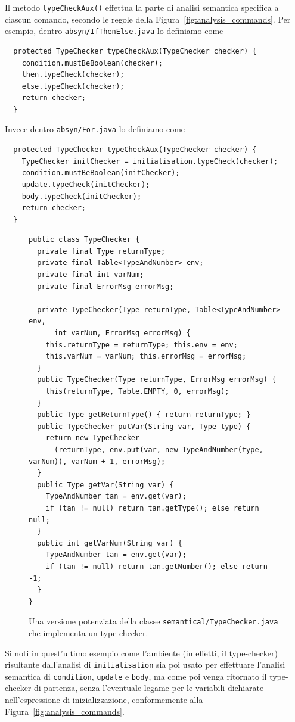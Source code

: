 Il metodo \texttt{typeCheckAux()} effettua la parte di analisi semantica
specifica a ciascun comando, secondo le regole della
Figura~\ref{fig:analysis_commands}. Per esempio, dentro
\texttt{absyn/IfThenElse.java} lo definiamo come
%
\begin{verbatim}
  protected TypeChecker typeCheckAux(TypeChecker checker) {
    condition.mustBeBoolean(checker);
    then.typeCheck(checker);
    else.typeCheck(checker);
    return checker;
  }
\end{verbatim}
%
Invece dentro \texttt{absyn/For.java} lo definiamo come
%
\begin{verbatim}
  protected TypeChecker typeCheckAux(TypeChecker checker) {
    TypeChecker initChecker = initialisation.typeCheck(checker);
    condition.mustBeBoolean(initChecker);
    update.typeCheck(initChecker);
    body.typeCheck(initChecker);
    return checker;
  }
\end{verbatim}
%
\begin{figure}[t]
{\small
\begin{verbatim}
public class TypeChecker {
  private final Type returnType;
  private final Table<TypeAndNumber> env;   
  private final int varNum;
  private final ErrorMsg errorMsg;

  private TypeChecker(Type returnType, Table<TypeAndNumber> env,
      int varNum, ErrorMsg errorMsg) {
    this.returnType = returnType; this.env = env;
    this.varNum = varNum; this.errorMsg = errorMsg;
  }
  public TypeChecker(Type returnType, ErrorMsg errorMsg) {
    this(returnType, Table.EMPTY, 0, errorMsg);
  }
  public Type getReturnType() { return returnType; }
  public TypeChecker putVar(String var, Type type) {
    return new TypeChecker
      (returnType, env.put(var, new TypeAndNumber(type, varNum)), varNum + 1, errorMsg);
  }
  public Type getVar(String var) {
    TypeAndNumber tan = env.get(var);
    if (tan != null) return tan.getType(); else return null;
  }
  public int getVarNum(String var) {
    TypeAndNumber tan = env.get(var);
    if (tan != null) return tan.getNumber(); else return -1;
  }
}
\end{verbatim}
}
\caption{Una versione potenziata della classe \texttt{semantical/TypeChecker.java} che implementa un type-checker.}
  \label{fig:semantical.TypeChecker}
\end{figure}
%
Si noti in quest'ultimo esempio come l'ambiente (in effetti, il type-checker)
risultante dall'analisi di \texttt{initialisation} sia poi usato per effettuare
l'analisi semantica di \texttt{condition}, \texttt{update} e \texttt{body}, ma
come poi venga ritornato il type-checker di partenza, senza l'eventuale
legame per le variabili dichiarate nell'espressione di inizializzazione,
conformemente alla Figura~\ref{fig:analysis_commands}.

